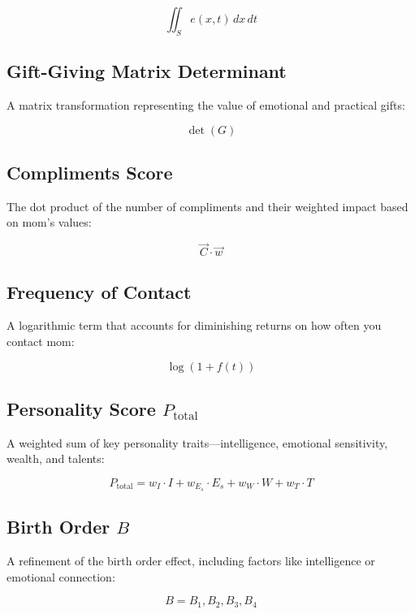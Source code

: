 \documentclass[12pt]{article}
\begin{document}
\begin{equation}
\iint_S e(x, t) \, dx \, dt
\end{equation}

\subsection{Gift-Giving Matrix Determinant}
A matrix transformation representing the value of emotional and practical gifts:

\begin{equation}
\det(G)
\end{equation}

\subsection{Compliments Score}
The dot product of the number of compliments and their weighted impact based on mom’s values:

\begin{equation}
\vec{C} \cdot \vec{w}
\end{equation}

\subsection{Frequency of Contact}
A logarithmic term that accounts for diminishing returns on how often you contact mom:

\begin{equation}
\log(1 + f(t))
\end{equation}

\subsection{Personality Score \texorpdfstring{$P_{\text{total}}$}{P total}}
A weighted sum of key personality traits—intelligence, emotional sensitivity, wealth, and talents:

\begin{equation}
P_{\text{total}} = w_I \cdot I + w_{E_s} \cdot E_s + w_W \cdot W + w_T \cdot T
\end{equation}

\subsection{Birth Order $B$}
A refinement of the birth order effect, including factors like intelligence or emotional connection:

\begin{equation}
B = B_1, B_2, B_3, B_4
\end{equation}
\end{document}
